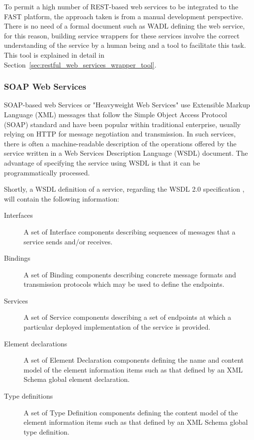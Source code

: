 \documentclass{fast_latex}
\begin{document}
To permit a high number of REST-based web services to be integrated to the FAST platform, the approach taken is from a manual development perspective. There is no need of a formal document such as WADL defining the web service, for this reason, building service wrappers for these services involve the correct understanding of the service by a human being and a tool to facilitate this task. This tool is explained in detail in Section~\ref{sec:restful_web_services_wrapper_tool}.


\subsubsection{SOAP Web Services} %
\label{ssub:soap_web_services}

SOAP-based web Services or "Heavyweight Web Services" use Extensible Markup Language (XML) \cite{XML1.1} messages that follow the Simple Object Access Protocol (SOAP) standard \cite{SOAP1.2} and have been popular within traditional enterprise, usually relying on HTTP for message negotiation and transmission. In such services, there is often a machine-readable description of the operations offered by the service written in a Web Services Description Language (WSDL) document. The advantage of specifying the service using WSDL is that it can be programmatically processed. 

Shortly, a WSDL definition of a service, regarding the WSDL 2.0 specification \cite{WSDL2.0}, will contain the following information:
\begin{description}
	\item[Interfaces] A set of Interface components describing sequences of messages that a service sends and/or receives.
	\item[Bindings] A set of Binding components describing concrete message formats and transmission protocols which may be used to define the endpoints.
	\item[Services] A set of Service components describing a set of endpoints at which a particular deployed implementation of the service is provided.
	\item[Element declarations] A set of Element Declaration components defining the name and content model of the element information items such as that defined by an XML Schema global element declaration.
	\item[Type definitions] A set of Type Definition components defining the content model of the element information items such as that defined by an XML Schema global type definition.
\end{description}
\end{document}

